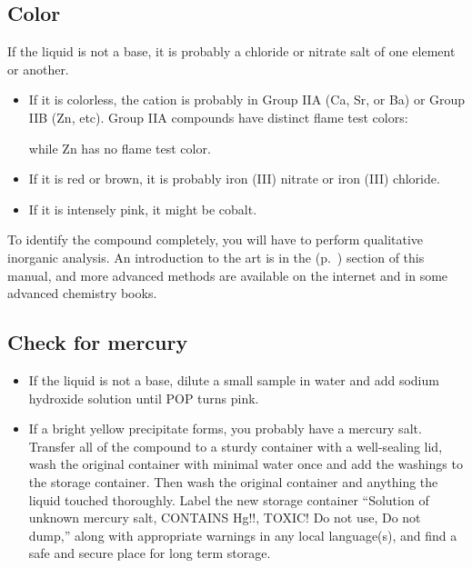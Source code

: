 \subsection{Color}
If the liquid is not a base, 
it is probably a chloride or nitrate salt of one element or another. 
\begin{itemize}
\item If it is colorless, 
the cation is probably in Group IIA (Ca, 
Sr, 
or Ba) or Group IIB (Zn, 
etc). 
Group IIA compounds have distinct flame test colors:
while Zn has no flame test color.
\item If it is red or brown, 
it is probably iron (III) nitrate or iron (III) chloride. 
\item If it is intensely pink, 
it might be cobalt. 
\end{itemize}
To identify the compound completely, 
you will have to perform qualitative inorganic analysis. 
An introduction to the art is 
in the  (p.~\pageref{cha:qualana}) section of this manual, 
and more advanced methods are available on the internet 
and in some advanced chemistry books.

\subsection{Check for mercury}
\begin{itemize}
\item If the liquid is not a base, 
dilute a small sample in water 
and add sodium hydroxide solution until POP turns pink. 
\item If a bright yellow precipitate forms, 
you probably have a mercury salt. 
Transfer all of the compound to a sturdy container 
with a well-sealing lid, 
wash the original container with minimal water once 
and add the washings to the storage container. 
Then wash the original container 
and anything the liquid touched thoroughly. 
Label the new storage container ``Solution of unknown mercury salt, 
CONTAINS Hg!!, 
TOXIC! Do not use, 
Do not dump,'' along with appropriate warnings in any local language(s), 
and find a safe and secure place for long term storage.
\end{itemize}

